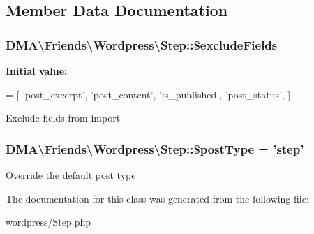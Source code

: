 \subsection{Member Data Documentation}
\hypertarget{classDMA_1_1Friends_1_1Wordpress_1_1Step_aa320e2b0f3f4a24c3cea41e133fd1145}{
\subsubsection[{\$exclude\-Fields}]{\setlength{\rightskip}{0pt plus 5cm}D\-M\-A\textbackslash{}\-Friends\textbackslash{}\-Wordpress\textbackslash{}\-Step\-::\$exclude\-Fields\hspace{0.3cm}{\ttfamily [protected]}}}\label{classDMA_1_1Friends_1_1Wordpress_1_1Step_aa320e2b0f3f4a24c3cea41e133fd1145}
{\bfseries Initial value\-:}
\begin{DoxyCode}
= [ 
        \textcolor{stringliteral}{'post\_excerpt'},
        \textcolor{stringliteral}{'post\_content'},
        \textcolor{stringliteral}{'is\_published'},
        \textcolor{stringliteral}{'post\_status'},
    ]
\end{DoxyCode}
Exclude fields from import \hypertarget{classDMA_1_1Friends_1_1Wordpress_1_1Step_abaa142e178d837a810e5048af7f36497}{
\subsubsection[{\$post\-Type}]{\setlength{\rightskip}{0pt plus 5cm}D\-M\-A\textbackslash{}\-Friends\textbackslash{}\-Wordpress\textbackslash{}\-Step\-::\$post\-Type = 'step'}}\label{classDMA_1_1Friends_1_1Wordpress_1_1Step_abaa142e178d837a810e5048af7f36497}
Override the default post type 

The documentation for this class was generated from the following file\-:\begin{DoxyCompactItemize}
\item 
wordpress/Step.\-php\end{DoxyCompactItemize}
